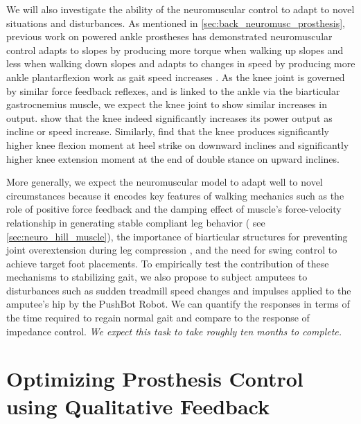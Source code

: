 We will also investigate the ability of the neuromuscular control to adapt to
novel situations and disturbances. As mentioned in
\cref{sec:back_neuromusc_prosthesis}, previous work on powered ankle prostheses
has demonstrated neuromuscular control adapts to slopes by producing more torque
when walking up slopes and less when walking down slopes
\citep{eilenberg2010control} and adapts to changes in speed by producing more
ankle plantarflexion work as gait speed increases \citep{markowitz2011speed}. As
the knee joint is governed by similar force feedback reflexes, and is linked to
the ankle via the biarticular gastrocnemius muscle, we expect the knee joint to
show similar increases in output. \citet{chen1997influence} show that the knee
indeed significantly increases its power output as incline or speed increase.
Similarly, \citet{mcintosh2006gait} find that the knee produces significantly
higher knee flexion moment at heel strike on downward inclines and significantly
higher knee extension moment at the end of double stance on upward inclines.

More generally, we expect the neuromuscular model to adapt well to novel
circumstances because it encodes key features of walking mechanics such as the
role of positive force feedback and the damping effect of muscle's
force-velocity relationship in generating stable compliant leg behavior
(\citep{grey2007positive} see \cref{sec:neuro_hill_muscle}), the importance of
biarticular structures for preventing joint overextension during leg compression
\citep{seyfarth2001stable}, and the need for swing control to achieve target
foot placements. To empirically test the contribution of these mechanisms to
stabilizing gait, we also propose to subject amputees to disturbances such as
sudden treadmill speed changes and impulses applied to the amputee's hip by the
PushBot Robot. We can quantify the responses in terms of the time required to
regain normal gait and compare to the response of impedance control. \emph{We
expect this task to take roughly ten months to complete.}

\section{Optimizing Prosthesis Control using Qualitative
Feedback}\label{sec:proposed_optimize}

